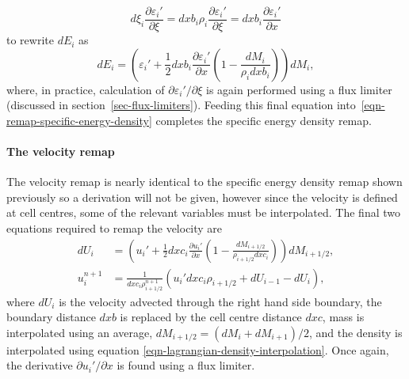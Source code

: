 \begin{equation}
  d\xi_i \frac{\partial \varepsilon_i'}{\partial \xi} = dxb_i\rho_i \frac{\partial \varepsilon_i'}{\partial \xi} = dxb_i \frac{\partial \varepsilon_i'}{\partial x}
\end{equation}
to rewrite $dE_i$ as
\begin{equation}
  dE_i = \left( \varepsilon_i' + \frac{1}{2}dxb_i\frac{\partial \varepsilon_i'}{\partial x} \left( 1 - \frac{dM_i}{\rho_i dxb_i} \right) \right)dM_i,
  \label{eqn-remap-energy-difference}
\end{equation}
where, in practice, calculation of $\partial \varepsilon_i'/\partial\xi$ is again performed using a flux limiter (discussed in section~\ref{sec-flux-limiters}). Feeding this final equation into~\eqref{eqn-remap-specific-energy-density} completes the specific energy density remap.

\paragraph{The velocity remap}
\label{sec-remap-velocity}
The velocity remap is nearly identical to the specific energy density remap shown previously so a derivation will not be given, however since the velocity is defined at cell centres, some of the relevant variables must be interpolated. The final two equations required to remap the velocity are 
\begin{align}
  dU_i &= \left( u_i' + \frac{1}{2}dxc_i\frac{\partial u_i'}{\partial x} \left( 1 - \frac{dM_{i+1/2}}{\rho_{i+1/2} dxc_i} \right) \right)dM_{i+1/2},\\
  u_i^{n+1}  &= \frac{1}{dxc_i \rho_{i+1/2}^{n+1}}(u_i' dxc_i \rho_{i+1/2} + dU_{i-1} - dU_i),
\end{align}
where $dU_i$ is the velocity advected through the right hand side boundary, the boundary distance $dxb$ is replaced by the cell centre distance $dxc$, mass is interpolated using an average, $dM_{i+1/2} = (dM_{i} + dM_{i+1})/2$, and the density is interpolated using equation \eqref{eqn-lagrangian-density-interpolation}. Once again, the derivative $\partial u_i' / \partial x$ is found using a flux limiter. 

